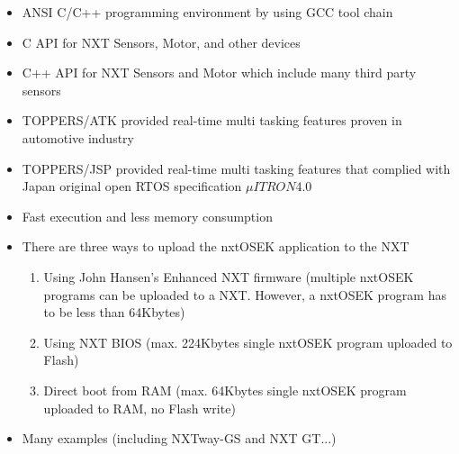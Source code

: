 \begin{itemize}
\item ANSI C/C++ programming environment by using GCC tool chain

    \item C API for NXT Sensors, Motor, and other devices
    \item C++ API for NXT Sensors and Motor which include many third party sensors
    \item TOPPERS/ATK provided real-time multi tasking features proven in automotive industry
    \item TOPPERS/JSP provided real-time multi tasking features that complied with Japan original open RTOS specification $\mu ITRON 4.0$
    \item Fast execution and less memory consumption
    \item There are three ways to upload the nxtOSEK application to the NXT
     \begin{enumerate}
	\item  Using John Hansen's Enhanced NXT firmware
		(multiple nxtOSEK programs can be uploaded to a NXT. However, a nxtOSEK program has to be less than 64Kbytes)
	\item Using NXT BIOS (max. 224Kbytes single nxtOSEK program uploaded to Flash)
	\item Direct boot from RAM (max. 64Kbytes single nxtOSEK program uploaded to RAM, no Flash write)
	\end{enumerate}
    \item Many examples (including NXTway-GS and NXT GT...)
\end{itemize}


